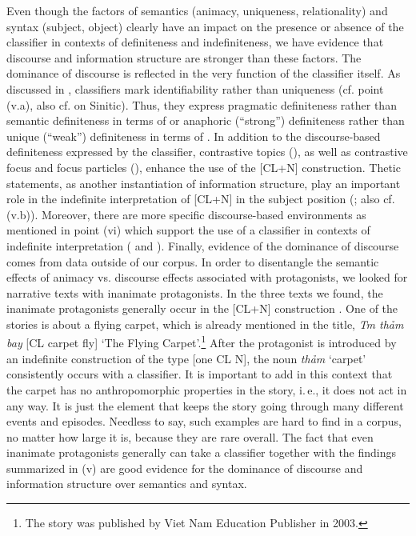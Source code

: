\documentclass[output=paper]{langsci/langscibook}
\begin{document}
Even though the factors of semantics (animacy, uniqueness, relationality) and syntax (subject, object) clearly have an impact on the presence or absence of the classifier in contexts of definiteness and indefiniteness, we have evidence that discourse and information structure are stronger than these factors. The dominance of discourse is reflected in the very function of the classifier itself. As discussed in , classifiers mark identifiability rather than uniqueness (cf. point (v.a), also cf. \citealt{li:bisang:12} on Sinitic). Thus, they express pragmatic definiteness rather than semantic definiteness in terms of \cite{lobner:85,lobner:11} or anaphoric (``strong'') definiteness rather than unique (``weak'') definiteness in terms of \cite{schwarz:09,schwarz:13}. In addition to the discourse-based definiteness expressed by the classifier, contrastive topics (), as well as contrastive focus and focus particles (), enhance the use of the [CL+N] construction. Thetic statements, as another instantiation of information structure, play an important role in the indefinite interpretation of [CL+N] in the subject position (; also cf. (v.b)). Moreover, there are more specific discourse-based environments as mentioned in point (vi) which support the use of a classifier in contexts of indefinite interpretation ( and ). Finally, evidence of the dominance of discourse comes from data outside of our corpus. In order to disentangle the semantic effects of animacy vs. discourse effects associated with protagonists, we looked for narrative texts with inanimate protagonists. In the three texts we found, the inanimate protagonists generally occur in the [CL+N] construction \citep{quang:forth}. One of the stories is about a flying carpet, which is already mentioned in the title, {\emph{T{\daa}m thảm bay}} [CL carpet fly] `The Flying Carpet'.\footnote{The story was published by Viet Nam Education Publisher in 2003.} After the protagonist is introduced by an indefinite construction of the type [one CL N], the noun {\emph{thảm}} `carpet' consistently occurs with a classifier. It is important to add in this context that the carpet has no anthropomorphic properties in the story, i.\,e., it does not act in any way. It is just the element that keeps the story going through many different events and episodes. Needless to say, such examples are hard to find in a corpus, no matter how large it is, because they are rare overall. The fact that even inanimate protagonists generally can take a classifier together with the findings summarized in (v) are good evidence for the dominance of discourse and information structure over semantics and syntax.
\end{document}
